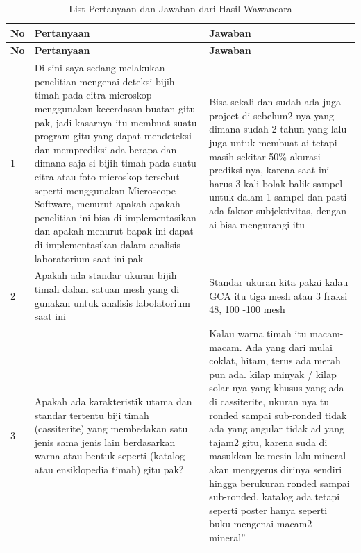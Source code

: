 {\footnotesize
\begin{longtable}{|p{}|p{}|p{}|}
\caption{List Pertanyaan dan Jawaban dari Hasil Wawancara}
\label{table:wawancara-bijih-timah} \\
\hline
\centering\textbf{No} & \centering\textbf{Pertanyaan} & \centering\arraybackslash\textbf{Jawaban} \\
\hline
\endfirsthead

\hline
\centering\textbf{No} & \centering\textbf{Pertanyaan} & \centering\arraybackslash\textbf{Jawaban} \\
\hline
\endhead

1 &
Di sini saya sedang melakukan penelitian mengenai deteksi bijih timah pada citra microskop menggunakan kecerdasan buatan gitu pak, jadi kasarnya itu membuat suatu program gitu yang dapat mendeteksi dan memprediksi ada berapa dan dimana saja si bijih timah pada suatu citra atau foto microskop tersebut seperti menggunakan Microscope Software, menurut apakah apakah penelitian ini bisa di implementasikan dan apakah menurut bapak ini dapat di implementasikan dalam analisis laboratorium saat ini pak &
Bisa sekali dan sudah ada juga project di sebelum2 nya yang dimana sudah 2 tahun yang lalu juga untuk membuat ai tetapi masih sekitar 50\% akurasi prediksi nya, karena saat ini harus 3 kali bolak balik sampel untuk dalam 1 sampel dan pasti ada faktor subjektivitas, dengan ai bisa mengurangi itu \\
\hline

2 &
Apakah ada standar ukuran bijih timah dalam satuan mesh yang di gunakan untuk analisis labolatorium saat ini &
Standar ukuran kita pakai kalau GCA itu tiga mesh atau 3 fraksi 48, 100 -100 mesh \\
\hline

3 &
Apakah ada karakteristik utama dan standar tertentu biji timah (cassiterite) yang membedakan satu jenis sama jenis lain berdasarkan warna atau bentuk seperti (katalog atau ensiklopedia timah) gitu pak? &
Kalau warna timah itu macam-macam. Ada yang dari mulai coklat, hitam, terus ada merah pun ada. kilap minyak / kilap solar nya yang khusus yang ada di cassiterite, ukuran nya tu ronded sampai sub-ronded tidak ada yang angular tidak ad yang tajam2 gitu, karena suda di masukkan ke mesin lalu mineral akan menggerus dirinya sendiri hingga berukuran ronded sampai sub-ronded, katalog ada tetapi seperti poster hanya seperti buku mengenai macam2 mineral'' \\
\hline


\end{longtable}}
